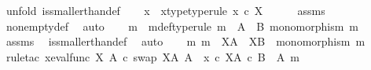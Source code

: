 \begin{isabellebody}
%
\isadelimproof
%
\endisadelimproof
%
\isatagproof
{}\isamarkupfalse%
\ {\isacharparenleft}{\kern0pt}unfold\ is{\isacharunderscore}{\kern0pt}smaller{\isacharunderscore}{\kern0pt}than{\isacharunderscore}{\kern0pt}def{\isacharparenright}{\kern0pt}\isanewline
\isanewline
\ \ \isamarkupfalse%
\ x\ \ x{\isacharunderscore}{\kern0pt}type{\isacharbrackleft}{\kern0pt}type{\isacharunderscore}{\kern0pt}rule{\isacharbrackright}{\kern0pt}{\isacharcolon}{\kern0pt}\ {\isachardoublequoteopen}x\ {\isasymin}\isactrlsub c\ X{\isachardoublequoteclose}\isanewline
\ \ \ \ \isamarkupfalse%
\ assms{\isacharparenleft}{\kern0pt}{}{\isacharparenright}{\kern0pt}\ \isamarkupfalse%
\ nonempty{\isacharunderscore}{\kern0pt}def\ \isamarkupfalse%
\ auto\isanewline
\isanewline
\ \ \isamarkupfalse%
\ m\ \ m{\isacharunderscore}{\kern0pt}def{\isacharbrackleft}{\kern0pt}type{\isacharunderscore}{\kern0pt}rule{\isacharbrackright}{\kern0pt}{\isacharcolon}{\kern0pt}\ {\isachardoublequoteopen}m\ {\isacharcolon}{\kern0pt}\ A\ {\isasymrightarrow}\ B{\isachardoublequoteclose}\ {\isachardoublequoteopen}monomorphism\ m{\isachardoublequoteclose}\isanewline
\ \ \ \ \isamarkupfalse%
\ assms{\isacharparenleft}{\kern0pt}{}{\isacharparenright}{\kern0pt}\ \isamarkupfalse%
\ is{\isacharunderscore}{\kern0pt}smaller{\isacharunderscore}{\kern0pt}than{\isacharunderscore}{\kern0pt}def\ \isamarkupfalse%
\ auto\isanewline
\isanewline
\ \ \isamarkupfalse%
\ {\isachardoublequoteopen}{\isasymexists}m{\isachardot}{\kern0pt}\ m\ {\isacharcolon}{\kern0pt}\ X\isactrlbsup A\isactrlesup \ {\isasymrightarrow}\ X\isactrlbsup B\isactrlesup \ {\isasymand}\ monomorphism\ m{\isachardoublequoteclose}\isanewline
\ \ \isamarkupfalse%
\ {\isacharparenleft}{\kern0pt}rule{\isacharunderscore}{\kern0pt}tac\ x{\isacharequal}{\kern0pt}{\isachardoublequoteopen}{\isacharparenleft}{\kern0pt}{\isacharparenleft}{\kern0pt}{\isacharparenleft}{\kern0pt}eval{\isacharunderscore}{\kern0pt}func\ X\ A\ {\isasymcirc}\isactrlsub c\ swap\ {\isacharparenleft}{\kern0pt}X\isactrlbsup A\isactrlesup {\isacharparenright}{\kern0pt}\ A{\isacharparenright}{\kern0pt}\ {\isasymamalg}\ {\isacharparenleft}{\kern0pt}x\ {\isasymcirc}\isactrlsub c\ {\isasymbeta}\isactrlbsub X\isactrlbsup A\isactrlesup \ {\isasymtimes}\isactrlsub c\ {\isacharparenleft}{\kern0pt}B\ {\isasymsetminus}\ {\isacharparenleft}{\kern0pt}A{\isacharcomma}{\kern0pt}\ m{\isacharparenright}{\kern0pt}{\isacharparenright}{\kern0pt}\isactrlesub {\isacharparenright}{\kern0pt}{\isacharparenright}{\kern0pt}\isanewline

\end{isabellebody}
